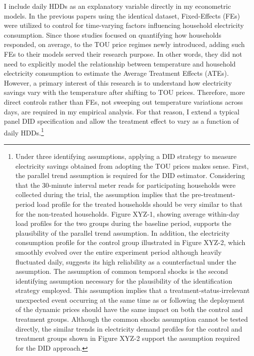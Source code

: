 I include daily HDDs as an explanatory variable directly in my econometric models. In the previous papers using the identical dataset, Fixed-Effects (FEs) were utilized to control for time-varying factors influencing household electricity consumption. Since those studies focused on quantifying how households responded, on average, to the TOU price regimes newly introduced, adding such FEs to their models served their research purpose. In other words, they did not need to explicitly model the relationship between temperature and household electricity consumption to estimate the Average Treatment Effects (ATEs). However, a primary interest of this research is to understand how electricity savings vary with the temperature after shifting to TOU prices. Therefore, more direct controls rather than FEs, not sweeping out temperature variations across days, are required in my empirical analysis. For that reason, I extend a typical panel DID specification and allow the treatment effect to vary as a function of daily HDDs.\footnote{Under three identifying assumptions, applying a DID strategy to measure electricity savings obtained from adopting the TOU prices makes sense. First, the parallel trend assumption is required for the DID estimator. Considering that the 30-minute interval meter reads for participating households were collected during the trial, the assumption implies that the pre-treatment-period load profile for the treated households should be very similar to that for the non-treated households. Figure XYZ-1, showing average within-day load profiles for the two groups during the baseline period, supports the plausibility of the parallel trend assumption. In addition, the electricity consumption profile for the control group illustrated in Figure XYZ-2, which smoothly evolved over the entire experiment period although heavily fluctuated daily, suggests its high reliability as a counterfactual under the assumption.
The assumption of common temporal shocks is the second identifying assumption necessary for the plausibility of the identification strategy employed. This assumption implies that a treatment-status-irrelevant unexpected event occurring at the same time as or following the deployment of the dynamic prices should have the same impact on both the control and treatment groups. Although the common shocks assumption cannot be tested directly, the similar trends in electricity demand profiles for the control and treatment groups shown in Figure XYZ-2 support the assumption required for the DID approach.
}
